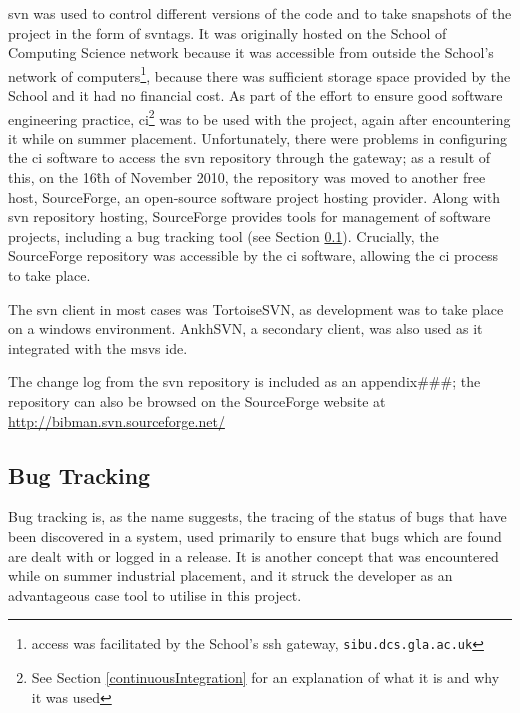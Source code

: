 \documentclass{l4proj}
\newcommand{\revisit}{\#\#\#}
\begin{document}
\gls{svn} was used to control different versions of the code and to take snapshots of the project in the form of \gls{svntag}s\cite{CFP04c4}.  It was originally hosted on the School of Computing Science network because it was accessible from outside the School's network of computers\footnote{access was facilitated by the School's \gls{ssh} gateway, \texttt{sibu.dcs.gla.ac.uk}}, because there was sufficient storage space provided by the School and it had no financial cost.  As part of the effort to ensure good software engineering practice, \gls{ci}\footnote{See Section \ref{continuousIntegration} for an explanation of what it is and why it was used} was to be used with the project, again after encountering it while on summer placement.  Unfortunately, there were problems in configuring the  \gls{ci}  software to access the \gls{svn} repository through the gateway; as a result of this, on the 16\^{th} of November 2010, the repository was moved to another free host, SourceForge, an open-source software project hosting provider.  Along with \gls{svn} repository hosting, SourceForge provides tools for management of software projects, including a bug tracking tool (see Section \ref{bugTracking}).  Crucially, the SourceForge repository was accessible by the \gls{ci} software, allowing the \gls{ci} process to take place.

The \gls{svn} client in most cases was TortoiseSVN, as development was to take place on a windows environment.  AnkhSVN, a secondary client, was also used as it integrated with the \gls{msvs} \gls{ide}. 

The change log from the \gls{svn} repository is included as an appendix\revisit; the repository can also be browsed on the SourceForge website at \url{http://bibman.svn.sourceforge.net/}

\subsection{Bug Tracking}
\label{bugTracking}
Bug tracking is, as the name suggests, the tracing of the status of bugs that have been discovered in a system, used primarily to ensure that bugs which are found are dealt with or logged in a release.  It is another concept that was encountered while on summer industrial placement, and it struck the developer as an advantageous \gls{case} tool to utilise in this project.
\end{document}
